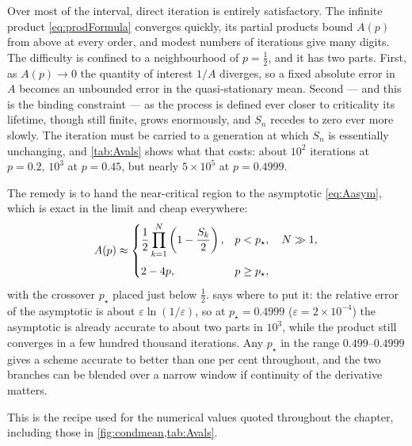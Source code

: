 Over most of the interval, direct iteration is entirely satisfactory. The infinite product
\cref{eq:prodFormula} converges quickly, its partial products bound $A(p)$ from above at
every order, and modest numbers of iterations give many digits. The difficulty is confined
to a neighbourhood of $p=\tfrac12$, and it has two parts. First, as $A(p)\to0$ the quantity
of interest $1/A$ diverges, so a fixed absolute error in $A$ becomes an unbounded error in
the quasi-stationary mean. Second --- and this is the binding constraint --- as the process
is defined ever closer to criticality its lifetime, though still finite, grows enormously,
and $S_n$ recedes to zero ever more slowly. The iteration must be carried to a generation
at which $S_n$ is essentially unchanging, and \cref{tab:Avals} shows what that costs: about
$10^2$ iterations at $p=0.2$, $10^3$ at $p=0.45$, but nearly $5\times10^5$ at $p=0.4999$.

The remedy is to hand the near-critical region to the asymptotic \cref{eq:Aasym}, which is
exact in the limit and cheap everywhere:
\begin{equation}
\label{eq:Apractical}
A(p) \approx
\begin{cases}
\displaystyle \frac12\prod_{k=1}^{N}\left(1-\frac{S_k}{2}\right), & p<p_\star,\quad N\gg1,\\[14pt]
2-4p, & p\ge p_\star,
\end{cases}
\end{equation}
with the crossover $p_\star$ placed just below $\tfrac12$.  says where to
put it: the relative error of the asymptotic is about $\varepsilon\ln(1/\varepsilon)$, so
at $p_\star = 0.4999$ ($\varepsilon = 2\times10^{-4}$) the asymptotic is already accurate
to about two parts in $10^3$, while the product still converges in a few hundred thousand
iterations. Any $p_\star$ in the range $0.499$--$0.4999$ gives a scheme accurate to better
than one per cent throughout, and the two branches can be blended over a narrow window if
continuity of the derivative matters.

This is the recipe used for the numerical values quoted throughout the chapter, including
those in \cref{fig:condmean,tab:Avals}.

\FloatBarrier
